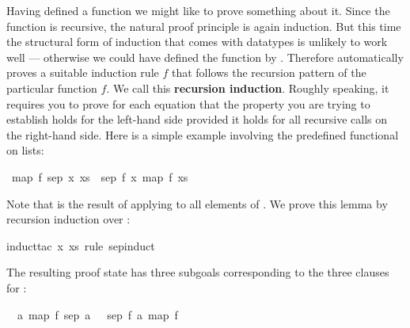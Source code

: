 \begin{isabellebody}
\begin{isamarkuptext}
Having defined a function we might like to prove something about it.
Since the function is recursive, the natural proof principle is
again induction. But this time the structural form of induction that comes
with datatypes is unlikely to work well --- otherwise we could have defined the
function by . Therefore  automatically
proves a suitable induction rule $f$ that follows the
recursion pattern of the particular function $f$. We call this
\textbf{recursion induction}. Roughly speaking, it
requires you to prove for each  equation that the property
you are trying to establish holds for the left-hand side provided it holds
for all recursive calls on the right-hand side. Here is a simple example
involving the predefined  functional on lists:%
\end{isamarkuptext}%
\isamarkuptrue%
\isamarkupfalse%
\ {}map\ f\ {}sep\ x\ xs{}\ {}\ sep\ {}f\ x{}\ {}map\ f\ xs{}{}%
\isadelimproof
%
\endisadelimproof
%
\isatagproof
%
\begin{isamarkuptxt}%
\noindent
Note that 
is the result of applying  to all elements of . We prove
this lemma by recursion induction over :%
\end{isamarkuptxt}%
\isamarkuptrue%
\isamarkupfalse%
{}induct{}tac\ x\ xs\ rule{}\ sep{}induct{}%
\begin{isamarkuptxt}%
\noindent
The resulting proof state has three subgoals corresponding to the three
clauses for :
\begin{isabelle}%
\ {}{}\ {}a{}\ map\ f\ {}sep\ a\ {}{}{}\ {}\ sep\ {}f\ a{}\ {}map\ f\ {}{}{}\isanewline

\end{isabelle}
\end{isamarkuptxt}
\end{isabellebody}
